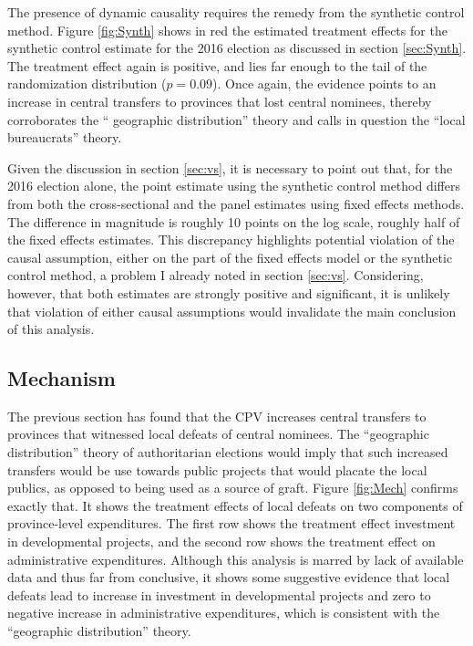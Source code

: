 \documentclass[12pt]{article}\usepackage[]{graphicx}\usepackage[]{color}
\newcommand{\1}{\mathbbm{1}}
\begin{document}
The presence of dynamic causality requires the remedy from the synthetic control method. Figure \ref{fig:Synth} shows in red the estimated treatment effects for the synthetic control estimate for the 2016 election as discussed in section \ref{sec:Synth}. The treatment effect again is positive, and lies far enough to the tail of the randomization distribution ($p = 0.09$). Once again, the evidence points to an increase in central transfers to provinces that lost central nominees, thereby corroborates the `` geographic distribution'' theory and calls in question the ``local bureaucrats'' theory.

Given the discussion in section \ref{sec:vs}, it is necessary to point out that, for the 2016 election alone, the point estimate using the synthetic control method differs from both the cross-sectional and the panel estimates using fixed effects methods. The difference in magnitude is roughly 10 points on the log scale, roughly half of the fixed effects estimates. This discrepancy highlights potential violation of the causal assumption, either on the part of the fixed effects model or the synthetic control method, a problem I already noted in section \ref{sec:vs}. Considering, however, that both estimates are strongly positive and significant, it is unlikely that violation of either causal assumptions would invalidate the main conclusion of this analysis.

\subsection{Mechanism}

The previous section has found that the CPV increases central transfers to provinces that witnessed local defeats of central nominees. The ``geographic distribution'' theory of authoritarian elections would imply that such increased transfers would be use towards public projects that would placate the local publics, as opposed to being used as a source of graft. Figure \ref{fig:Mech} confirms exactly that. It shows the treatment effects of local defeats on two components of province-level expenditures. The first row shows the treatment effect investment in developmental projects, and the second row shows the treatment effect on administrative expenditures. Although this analysis is marred by lack of available data and thus far from conclusive, it shows some suggestive evidence that local defeats lead to increase in investment in developmental projects and zero to negative increase in administrative expenditures, which is consistent with the ``geographic distribution'' theory.
\end{document}
